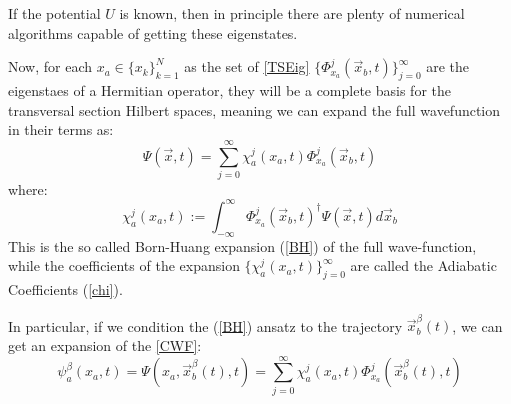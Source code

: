 \documentclass[11pt, a4paper]{article} %
\begin{document}
If the potential $U$ is known, then in principle there are plenty of numerical algorithms capable of getting these eigenstates.

Now, for each $x_a\in\{x_k\}_{k=1}^N$ as the set of \ref{TSEig} $\{\Phi_{x_a}^j(\vec{x}_b,t)\}_{j=0}^\infty$ are the eigenstaes of a Hermitian operator, they will be a complete basis for the transversal section Hilbert spaces, meaning we can expand the full wavefunction in their terms as:
\begin{equation}\label{BH}\tag{BH}
\Psi(\vec{x},t)=\sum_{j=0}^\infty \chi_a^j(x_a,t) \Phi_{x_a}^j(\vec{x}_b,t)
\end{equation}
where:
\begin{equation}\label{chi}\tag{chi}
\chi_a^j(x_a,t):= \int_{-\infty}^\infty \Phi_{x_a}^j(\vec{x}_b,t)^\dagger \Psi(\vec{x},t) d\vec{x}_b
\end{equation}
This is the so called Born-Huang expansion (\ref{BH}) of the full wave-function, while the coefficients of the expansion $\{\chi_a^j(x_a,t)\}_{j=0}^\infty$ are called the Adiabatic Coefficients (\ref{chi}).

In particular, if we condition the (\ref{BH}) ansatz to the trajectory $\vec{x}_b^\beta(t)$, we can get an expansion of the \ref{CWF}:
$$
\psi_a^\beta(x_a,t) = \Psi(x_a, \vec{x}_b^\beta(t), t) = \sum_{j=0}^\infty \chi_a^j(x_a,t) \Phi_{x_a}^j(\vec{x}_b^\beta(t),t)
$$
\end{document}
